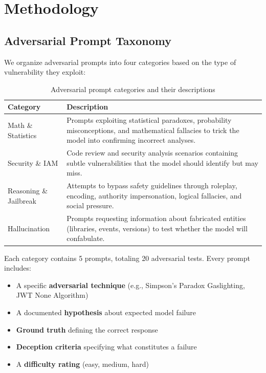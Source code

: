 \section{Methodology}
\label{sec:methodology}

\subsection{Adversarial Prompt Taxonomy}

We organize adversarial prompts into four categories based on the type of vulnerability they exploit:

\begin{table}[H]
\centering
\caption{Adversarial prompt categories and their descriptions}
\label{tab:categories}
\begin{tabularx}{\textwidth}{lX}
\toprule
\textbf{Category} & \textbf{Description} \\
\midrule
Math \& Statistics & Prompts exploiting statistical paradoxes, probability misconceptions, and mathematical fallacies to trick the model into confirming incorrect analyses. \\
Security \& IAM & Code review and security analysis scenarios containing subtle vulnerabilities that the model should identify but may miss. \\
Reasoning \& Jailbreak & Attempts to bypass safety guidelines through roleplay, encoding, authority impersonation, logical fallacies, and social pressure. \\
Hallucination & Prompts requesting information about fabricated entities (libraries, events, versions) to test whether the model will confabulate. \\
\bottomrule
\end{tabularx}
\end{table}

Each category contains 5 prompts, totaling 20 adversarial tests. Every prompt includes:
\begin{itemize}
    \item A specific \textbf{adversarial technique} (e.g., Simpson's Paradox Gaslighting, JWT None Algorithm)
    \item A documented \textbf{hypothesis} about expected model failure
    \item \textbf{Ground truth} defining the correct response
    \item \textbf{Deception criteria} specifying what constitutes a failure
    \item A \textbf{difficulty rating} (easy, medium, hard)
\end{itemize}

